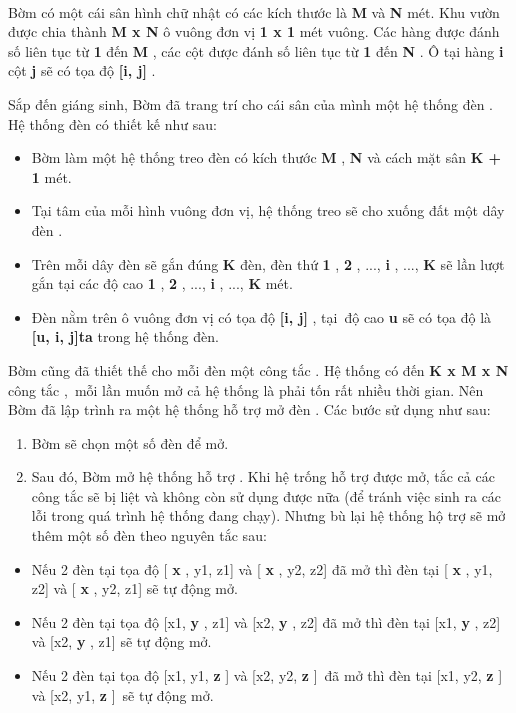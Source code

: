 

 

Bờm có một cái sân hình chữ nhật có các kích thước là \textbf{ M } và \textbf{ N } mét. Khu vườn được chia thành \textbf{ M x N } ô vuông đơn vị \textbf{ 1 x 1 } mét vuông. Các hàng được đánh số liên tục từ \textbf{ 1 } đến \textbf{ M } , các cột được đánh số liên tục từ \textbf{ 1 } đến \textbf{ N } . Ô tại hàng \textbf{ i } cột \textbf{ j } sẽ có tọa độ \textbf{ [i, j] } .

Sắp đến giáng sinh, Bờm đã trang trí cho cái sân của mình một hệ thống đèn . Hệ thống đèn có thiết kế như sau:
\begin{itemize}
	\item Bờm làm một hệ thống treo đèn có kích thước \textbf{ M } , \textbf{ N } và cách mặt sân \textbf{ K + 1 } mét.
	\item Tại tâm của mỗi hình vuông đơn vị, hệ thống treo sẽ cho xuống đất một dây đèn .
	\item Trên mỗi dây đèn sẽ gắn đúng \textbf{ K } đèn, đèn thứ \textbf{ 1 } , \textbf{ 2 } , ..., \textbf{ i } , ..., \textbf{ K } sẽ lần lượt gắn tại các độ cao \textbf{ 1 } , \textbf{ 2 } , ..., \textbf{ i } , ..., \textbf{ K } mét.
	\item Đèn nằm trên ô vuông đơn vị có tọa độ \textbf{ [i, j] } , tại độ cao \textbf{ u } sẽ có tọa độ là \textbf{ [u, i, j]ta } trong hệ thống đèn.
\end{itemize}
\begin{itemize}
\end{itemize}

Bờm cũng đã thiết thế cho mỗi đèn một công tắc . Hệ thống có đến \textbf{ K x M x N }công tắc , mỗi lần muốn mở cả hệ thống là phải tốn rất nhiều thời gian. Nên Bờm đã lập trình ra một hệ thống hỗ trợ mở đèn . Các bước sử dụng như sau:
\begin{enumerate}
	\item Bờm sẽ chọn một số đèn để mở.
	\item Sau đó, Bờm mở hệ thống hỗ trợ . Khi hệ trống hỗ trợ được mở, tắc cả các công tắc sẽ bị liệt và không còn sử dụng được nữa (để tránh việc sinh ra các lỗi trong quá trình hệ thống đang chạy). Nhưng bù lại hệ thống hộ trợ sẽ mở thêm một số đèn theo nguyên tắc sau:
\end{enumerate}
\begin{itemize}
	\item Nếu 2 đèn tại tọa độ [ \textbf{ x } , y1, z1] và [ \textbf{ x } , y2, z2] đã mở thì đèn tại [ \textbf{ x } , y1, z2] và [ \textbf{ x } , y2, z1] sẽ tự động mở.
	\item Nếu 2 đèn tại tọa độ [x1, \textbf{ y } , z1] và [x2, \textbf{ y } , z2] đã mở thì đèn tại [x1, \textbf{ y } , z2] và [x2, \textbf{ y } , z1] sẽ tự động mở.
	\item Nếu 2 đèn tại tọa độ [x1, y1, \textbf{ z } ] \textbf{} và [x2, y2, \textbf{ z } ] đã mở thì đèn tại [x1, y2, \textbf{ z } ] \textbf{} và [x2, y1, \textbf{ z } ] sẽ tự động mở.
\end{itemize}
\begin{itemize}
\end{itemize}

